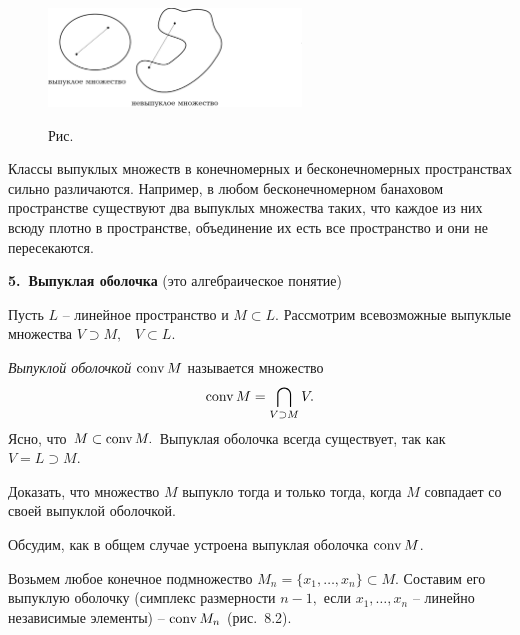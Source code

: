   \begin{figure}[ht]
\begin{center}
\includegraphics[width=0.6\textwidth]{pict08-1.eps}
\end{center}
 \bigskip
 \label{r8-1}

 \centerline{Рис.~\theris}
 \bigskip
\end{figure}



  {Классы выпуклых множеств в конечномерных и бесконечномерных} пространствах
 сильно различаются. Например, в
 любом бесконечномерном банаховом пространстве существуют два выпуклых
 множества таких, что каждое из них всюду плотно в пространстве,
 объединение их есть все пространство и они не пересекаются.

\vspace{5mm}
{\bf 5.~Выпуклая оболочка} {(это алгебраическое понятие)}
\vspace{5mm}

Пусть $L$ -- линейное пространство и
 $M\subset L.$ Рассмотрим всевозможные выпуклые множества
 $V\supset M,$~ $V\subset L.$

 {\it Выпуклой оболочкой} ${\rm conv\,} M$ называется множество
 $$
 {\rm conv\,} M=\bigcap_{V\supset M} V.
 $$
 Ясно, что $M\subset {\rm conv\,} M.$ Выпуклая оболочка
 всегда существует, так как $V=L\supset M.$

 \ex
 Доказать, что множество $M$ выпукло тогда и только тогда, когда $M$
 совпадает со своей выпуклой оболочкой.

{Обсудим}, как в общем случае устроена выпуклая оболочка ${\rm conv\,} M$.

 Возьмем любое конечное подмножество $M_n=\{ x_1,\ldots,x_n\}\subset M.$
 Составим его выпуклую оболочку (симплекс размерности $n-1,$
 если $x_1,\ldots,x_n$ -- линейно независимые элементы) -- ${\rm conv\,} M_n$ (рис.~8.2).

\vspace{10mm}


